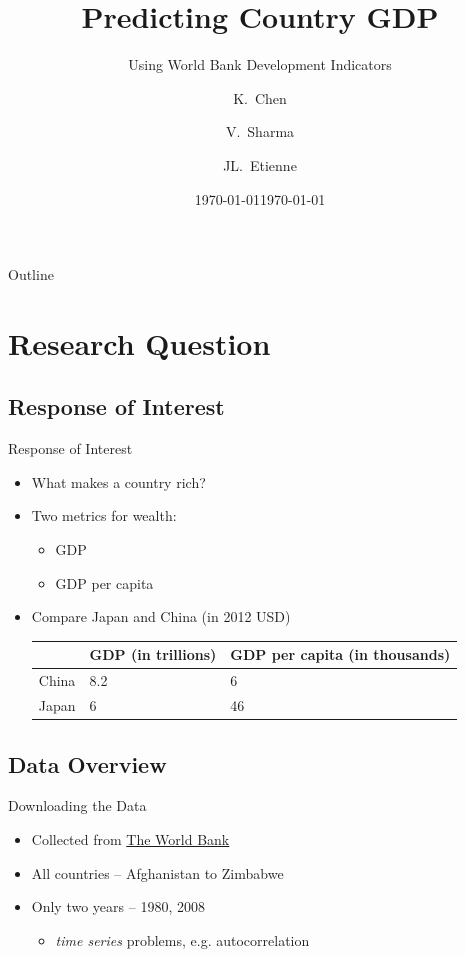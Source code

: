 \documentclass{beamer}
\title{Predicting Country GDP}
\subtitle{Using World Bank Development Indicators}
\date{\today}
\author{K.~Chen\inst{1} \and V.~Sharma\inst{1} \and JL.~Etienne\inst{1}}
\institute[Williams College] 
{
  \inst{1}
  Statistics 202 \\
  Williams College
}
\date{\today}
\begin{document}
\begin{frame}
\titlepage
\end{frame}

\begin{frame}{Outline}
\tableofcontents%
\end{frame}


\section{Research Question}

\subsection{Response of Interest}
\begin{frame}{Response of Interest}
\begin{itemize}
\item What makes a country rich?
\item Two metrics for wealth:
	\begin{itemize}
	\item GDP
	\item GDP per capita
	\end{itemize}
\item Compare Japan and China (in 2012 USD)
\begin{table}
    \begin{tabular}{| l | l | l |} \hline
    ~     & GDP (in trillions) & GDP per capita (in thousands) \\ \hline
    China & 8.2                            & 6                                         \\ \hline
    Japan & 6                              & 46                                        \\ \hline
    \end{tabular}
\end{table}
\end{itemize}
\end{frame}



\subsection{Data Overview}
\begin{frame}{Downloading the Data}
\begin{itemize}
	\item Collected from \href{http://data.worldbank.org/indicator}{The World Bank} 
	\item All countries -- Afghanistan to Zimbabwe
	\item Only two years -- 1980, 2008
		\begin{itemize}
	    \item \emph{time series} problems, e.g. autocorrelation
		\end{itemize}
\end{itemize}
\end{frame}
\end{document}
